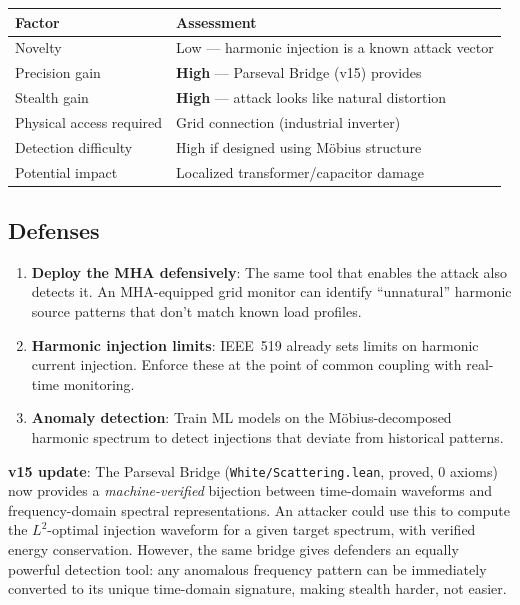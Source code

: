 \documentclass[11pt,a4paper]{article}
\begin{document}
\begin{center}
\begin{tabular}{@{}ll@{}}
\toprule
\textbf{Factor} & \textbf{Assessment} \\
\midrule
Novelty & Low --- harmonic injection is a known attack vector \\
Precision gain & \textbf{High} --- Parseval Bridge (v15) provides \\
Stealth gain & \textbf{High} --- attack looks like natural distortion \\
Physical access required & Grid connection (industrial inverter) \\
Detection difficulty & High if designed using M\"obius structure \\
Potential impact & Localized transformer/capacitor damage \\
\bottomrule
\end{tabular}
\end{center}

\subsection{Defenses}

\begin{enumerate}
  \item \textbf{Deploy the MHA defensively}: The same tool that
    enables the attack also detects it. An MHA-equipped grid monitor
    can identify ``unnatural'' harmonic source patterns that don't
    match known load profiles.
  \item \textbf{Harmonic injection limits}: IEEE~519 already sets
    limits on harmonic current injection. Enforce these at the
    point of common coupling with real-time monitoring.
  \item \textbf{Anomaly detection}: Train ML models on the
    M\"obius-decomposed harmonic spectrum to detect injections that
    deviate from historical patterns.
\end{enumerate}

\textbf{v15 update}: The Parseval Bridge
(\texttt{White/Scattering.lean}, proved, 0 axioms) now provides a
\emph{machine-verified} bijection between time-domain waveforms and
frequency-domain spectral representations. An attacker could use this
to compute the $L^2$-optimal injection waveform for a given target
spectrum, with verified energy conservation. However, the same bridge
gives defenders an equally powerful detection tool: any anomalous
frequency pattern can be immediately converted to its unique
time-domain signature, making stealth harder, not easier.
\end{document}
